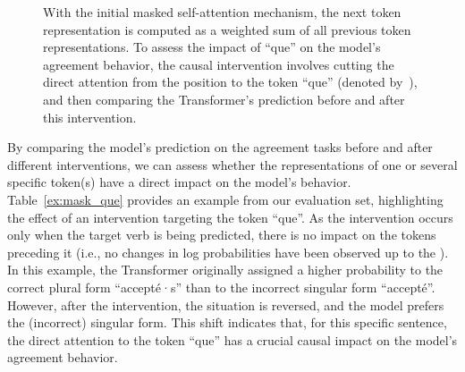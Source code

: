 \begin{figure}[ht]
{
}
\caption{With the initial masked self-attention mechanism, the next token representation is computed as a weighted sum of all previous token representations. To assess the impact of ``que'' on the model's agreement behavior, the causal intervention involves cutting the direct attention from the \target position to the token ``que'' (denoted by~\textcolor{red}{}), and then comparing the Transformer's prediction before and after this intervention.}\label{fig:mask_que}
\end{figure}


By comparing the model's prediction on the agreement tasks before and after different interventions, we can assess whether the representations of one or
several specific token(s) have a direct impact on the model's behavior. Table~\ref{ex:mask_que} provides an example from our evaluation set, highlighting the effect of an intervention targeting the token ``que''. As the intervention occurs only when the target verb is
being predicted, there is no impact on the tokens preceding it (i.e., no changes in log probabilities have been observed up to the \target). In this example, the Transformer originally assigned a higher
probability to the correct plural form ``accepté·s'' than to the
incorrect singular form ``accepté''. However, after the intervention, the
situation is reversed, and the model prefers the (incorrect) singular
form. This shift indicates that, for this specific sentence, the direct attention to the token ``que'' has a crucial causal impact on the model's agreement behavior.





